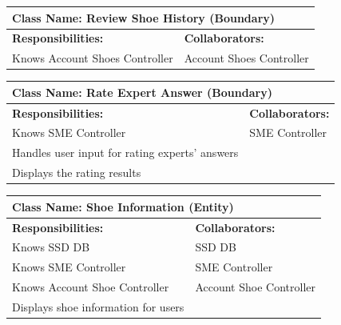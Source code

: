 \documentclass[]{article}
\begin{document}
\begin{table}[H]
    \centering
    \begin{tabular}{|p{}|p{}|}
        \hline
        \multicolumn{2}{|l|}{\textbf{Class Name:} Review Shoe History (Boundary)} \\
        \hline
        \textbf{Responsibilities:} & \textbf{Collaborators:} \\
        \hline
        Knows Account Shoes Controller & Account Shoes Controller \\
        \hline
    \end{tabular}
    \label{tab:review_shoe_history}
\end{table}

\begin{table}[H]
    \centering
    \begin{tabular}{|p{}|p{}|}
        \hline
        \multicolumn{2}{|l|}{\textbf{Class Name:} Rate Expert Answer (Boundary)} \\
        \hline
        \textbf{Responsibilities:} & \textbf{Collaborators:} \\
        \hline
        Knows SME Controller & SME Controller \\
        Handles user input for rating experts' answers  &  \\
        Displays the rating results  &  \\
        \hline
    \end{tabular}
    \label{tab:rate_expert_answer}
\end{table}

\begin{table}[H]
    \centering
    \begin{tabular}{|p{}|p{}|}
        \hline
        \multicolumn{2}{|l|}{\textbf{Class Name:} Shoe Information (Entity)} \\
        \hline
        \textbf{Responsibilities:} & \textbf{Collaborators:} \\
        \hline
        Knows SSD DB & SSD DB \\
        Knows SME Controller & SME Controller \\
        Knows Account Shoe Controller & Account Shoe Controller \\
        Displays shoe information for users & \\
        \hline
    \end{tabular}
    \label{tab:shoe_information}
\end{table}
\end{document}
